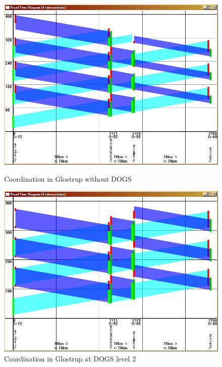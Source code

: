 \begin{figure}[ht]

    \begin{minipage}[b]{0.5\linewidth}
    
\begin{center}
\includegraphics[scale=0.22]{coord_p1_glostrup_c80.PNG} 
\end{center}
\caption{Coordination in Glostrup without DOGS}
\label{fig:coord_p1_glostrup_c80}

    \end{minipage}
    \hspace{0.5cm}
    \begin{minipage}[b]{0.5\linewidth}

\begin{center}
\includegraphics[scale=0.22]{coord_p1_glostrup_c100.PNG} 
\end{center}
\caption{Coordination in Glostrup at DOGS level 2}
\label{fig:coord_p1_glostrup_c100}

    \end{minipage}
    
\end{figure}

